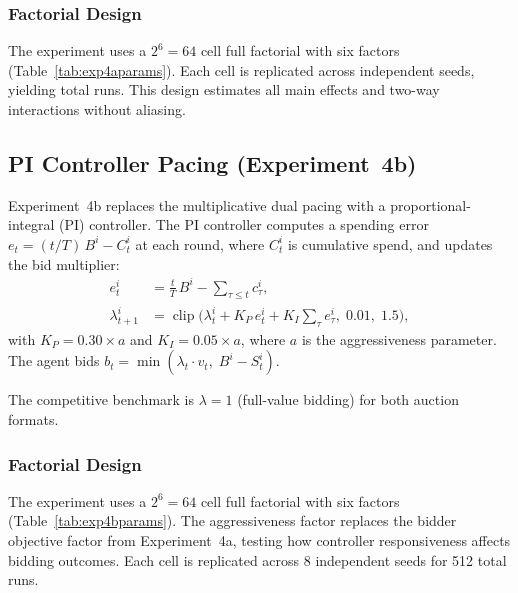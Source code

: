 \subsubsection{Factorial Design}

The experiment uses a $2^6 = 64$ cell full factorial with six factors (Table~\ref{tab:exp4aparams}). Each cell is replicated across independent seeds, yielding \ExpFourANobs{} total runs. This design estimates all main effects and two-way interactions without aliasing.

\subsection{PI Controller Pacing (Experiment~4b)}
\label{sec:exp4b_appendix}

Experiment~4b replaces the multiplicative dual pacing with a proportional-integral (PI) controller. The PI controller computes a spending error $e_t = (t/T)\,B^i - C_t^i$ at each round, where $C_t^i$ is cumulative spend, and updates the bid multiplier:
\begin{align}
  e_t^i &= \tfrac{t}{T}\,B^i - {\textstyle\sum_{\tau \le t}} c_\tau^i, \label{eq:pid_error_exp4b}\\
  \lambda_{t+1}^i &= \operatorname{clip}\!\bigl(\lambda_t^i + K_P\,e_t^i + K_I\!\textstyle\sum_{\tau} e_\tau^i,\; 0.01,\; 1.5\bigr), \label{eq:pid_update_exp4b}
\end{align}
with $K_P = 0.30 \times a$ and $K_I = 0.05 \times a$, where $a$ is the aggressiveness parameter. The agent bids $b_t = \min(\lambda_t \cdot v_t,\; B^i - S_t^i)$.

The competitive benchmark is $\lambda = 1$ (full-value bidding) for both auction formats.

\subsubsection{Factorial Design}

The experiment uses a $2^6 = 64$ cell full factorial with six factors (Table~\ref{tab:exp4bparams}). The aggressiveness factor replaces the bidder objective factor from Experiment~4a, testing how controller responsiveness affects bidding outcomes. Each cell is replicated across 8 independent seeds for 512 total runs.

